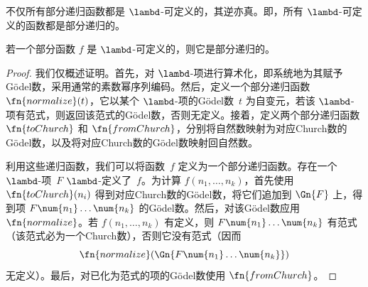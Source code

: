 \documentclass[../../../include/open-logic-section]{subfiles}
\begin{document}

不仅所有部分递归函数都是 $\lambd$-可定义的，其逆亦真。即，所有 $\lambd$-可定义的函数都是部分递归的。

\begin{thm}
   若一个部分函数 $f$ 是 $\lambd$-可定义的，则它是部分递归的。
\end{thm}

\begin{proof}
我们仅概述证明。首先，对 $\lambd$-项进行算术化，即系统地为其赋予Gödel数，采用通常的素数幂序列编码。然后，定义一个部分递归函数 $\fn{normalize}(t)$，它以某个 $\lambd$-项的Gödel数~$t$ 为自变元，若该 $\lambd$-项有范式，则返回该范式的Gödel数，否则无定义。接着，定义两个部分递归函数 $\fn{toChurch}$ 和 $\fn{fromChurch}$，分别将自然数映射为对应Church数的Gödel数，以及将对应Church数的Gödel数映射回自然数。

利用这些递归函数，我们可以将函数~$f$ 定义为一个部分递归函数。存在一个 $\lambd$-项~$F$ $\lambd$-定义了~$f$。为计算 $f(n_1, \dots, n_k)$，首先使用 $\fn{toChurch}(n_i)$ 得到对应Church数的Gödel数，将它们追加到 $\Gn{F}$ 上，得到项 $F \num{n_1}\dots\num{n_k}$ 的Gödel数。然后，对该Gödel数应用 $\fn{normalize}$。若 $f(n_1, \dots, n_k)$ 有定义，则 $F \num{n_1}\dots\num{n_k}$ 有范式（该范式必为一个Church数），否则它没有范式（因而 \[\fn{normalize}(\Gn{F\num{n_1}\dots\num{n_k}})\] 无定义）。最后，对已化为范式的项的Gödel数使用 $\fn{fromChurch}$。
\end{proof}
\end{document}
